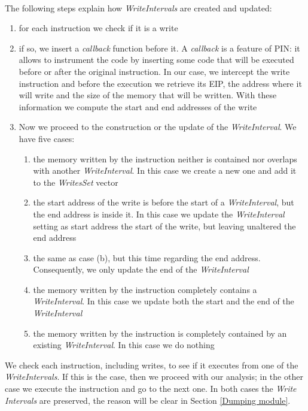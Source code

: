 \paragraph{}
The following steps explain how \textit{WriteIntervals} are created and updated:
\begin{enumerate}
\item for each instruction we check if it is a write
\item if so, we insert a \textit{callback} function before it. A \textit{callback} is a feature of PIN: it allows to instrument the code by inserting some code that will be executed before or after the original instruction. In our case, we intercept the write instruction and before the execution we retrieve its EIP, the address where it will write and the size of the memory that will be written. With these information we compute the start and end addresses of the write
\item Now we proceed to the construction or the update of the \textit{WriteInterval}. We have five cases:
	\begin{enumerate}
	\item the memory written by the instruction neither is contained nor overlaps with another \textit{WriteInterval}. In this case we create a new one and add it to the \textit{WritesSet} vector
	\item the start address of the write is before the start of a \textit{WriteInterval}, but the end address is inside it. In this case we update the \textit{WriteInterval} setting as start address the start of the write, but leaving unaltered the end address
	\item the same as case (b), but this time regarding the end address. Consequently, we only update the end of the \textit{WriteInterval} 
	\item the memory written by the instruction completely contains a \textit{WriteInterval}. In this case we update both the start and the end of the \textit{WriteInterval}
	\item the memory written by the instruction is completely contained by an existing \textit{WriteInterval}. In this case we do nothing
	\end{enumerate}
\end{enumerate}
We check each instruction, including writes, to see if it executes from one of the \textit{WriteIntervals}. If this is the case, then we proceed with our analysis; in the other case we execute the instruction and go to the next one. In both cases the \textit{Write Intervals} are preserved, the reason will be clear in Section \ref{Dumping module}.\\

